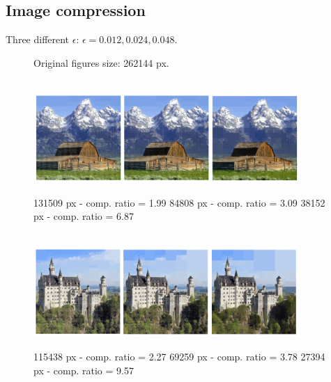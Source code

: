 \documentclass[8pt]{beamer}
\begin{document}
\subsection{Image compression}
\begin{frame}
Three different $\epsilon$: $\epsilon = 0.012, 0.024, 0.048$.
\begin{center}
 \begin{figure}[!h]
 \begin{footnotesize}
  Original figures size: 262144 px. 
 \end{footnotesize}\\
\includegraphics[width=0.9\textwidth]{./figures/s1_comp_small} \\
\begin{footnotesize}131509 px - comp. ratio = 1.99 \hfill 84808 px - comp. ratio = 3.09 \hfill 38152 px - comp. ratio = 6.87 \end{footnotesize} \\
\includegraphics[width=0.9\textwidth]{./figures/s2_comp_small}\\
\begin{footnotesize}115438 px - comp. ratio = 2.27 \hfill 69259 px - comp. ratio = 3.78 \hfill 27394 px - comp. ratio = 9.57 \end{footnotesize} \\
\end{figure}
\end{center}
\end{frame}
\end{document}
